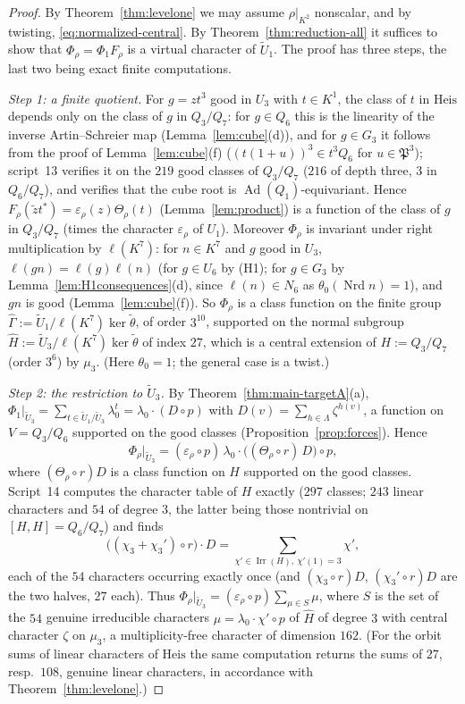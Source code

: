 \documentclass[11pt]{article}
\newcommand{\Nrd}{\operatorname{Nrd}}
\newcommand{\Irr}{\operatorname{Irr}}
\newcommand{\Ad}{\operatorname{Ad}}
\newcommand{\tU}{\widetilde U}
\newcommand{\tth}{\widetilde\theta}
\newcommand{\Pfr}{\mathfrak P}
\theoremstyle{plain}
\theoremstyle{definition}
\begin{document}
\begin{proof}
By Theorem~\ref{thm:levelone} we may assume $\rho|_{K^2}$ nonscalar, and
by twisting, \eqref{eq:normalized-central}.  By
Theorem~\ref{thm:reduction-all} it suffices to show that
$\Phi_\rho=\Phi_1F_\rho$ is a virtual character of $\tU_1$.  The proof
has three steps, the last two being exact finite computations.

\emph{Step 1: a finite quotient.}  For $g=zt^3$ good in $U_3$ with
$t\in K^1$, the class of $t$ in $\mathrm{Heis}$ depends only on the
class of $g$ in $Q_3/Q_7$: for $g\in Q_6$ this is the linearity of the
inverse Artin--Schreier map (Lemma~\ref{lem:cube}(d)), and for
$g\in G_3$ it follows from the proof of Lemma~\ref{lem:cube}(f)
($(t(1+u))^3\in t^3Q_6$ for $u\in\Pfr^3$); script~13 verifies it on
the $219$ good classes of $Q_3/Q_7$ ($216$ of depth three, $3$ in
$Q_6/Q_7$), and verifies that the cube root is $\Ad(Q_1)$-equivariant.
Hence $F_\rho(\tilde zt^*)=\varepsilon_\rho(z)\Theta_\rho(t)$
(Lemma~\ref{lem:product}) is a function of the class of $g$ in
$Q_3/Q_7$ (times the character $\varepsilon_\rho$ of $U_1$).  Moreover
$\Phi_\rho$ is invariant under right multiplication by $\ell(K^7)$: for
$n\in K^7$ and $g$ good in $U_3$, $\ell(gn)=\ell(g)\ell(n)$ (for
$g\in U_6$ by (H1); for $g\in G_3$ by Lemma~\ref{lem:H1consequences}(d),
since $\ell(n)\in N_6$ as $\theta_0(\Nrd n)=1$), and $gn$ is good
(Lemma~\ref{lem:cube}(f)).  So $\Phi_\rho$ is a class function on the
finite group $\hat\Gamma:=\tU_1/\ell(K^7)\ker\tth$, of order $3^{10}$,
supported on the normal subgroup $\hat H:=\tU_3/\ell(K^7)\ker\tth$ of
index $27$, which is a central extension of $H:=Q_3/Q_7$ (order $3^6$)
by $\mu_3$.  (Here $\theta_0=1$; the general case is a twist.)

\emph{Step 2: the restriction to $\tU_3$.}  By
Theorem~\ref{thm:main-targetA}(a), $\Phi_1|_{\tU_3}=\sum_{t\in\tU_1/\tU_3}\lambda_0^t=\lambda_0\cdot(D\circ p)$
with $D(v)=\sum_{h\in\Lambda}\zeta^{h(v)}$, a function on $V=Q_3/Q_6$
supported on the good classes (Proposition~\ref{prop:forces}).  Hence
\[
 \Phi_\rho|_{\tU_3}=(\varepsilon_\rho\circ p)\,\lambda_0\cdot\bigl((\Theta_\rho\circ r)\,D\bigr)\circ p ,
\]
where $(\Theta_\rho\circ r)D$ is a class function on $H$ supported on
the good classes.  Script~14 computes the character table of $H$
exactly ($297$ classes; $243$ linear characters and $54$ of degree
$3$, the latter being those nontrivial on $[H,H]=Q_6/Q_7$) and finds
\[
 \bigl((\chi_3+\chi_3')\circ r\bigr)\cdot D=\sum_{\chi'\in\Irr(H),\ \chi'(1)=3}\chi' ,
\]
each of the $54$ characters occurring exactly once (and
$(\chi_3\circ r)D$, $(\chi_3'\circ r)D$ are the two halves, $27$ each).
Thus $\Phi_\rho|_{\tU_3}=(\varepsilon_\rho\circ p)\sum_{\mu\in S}\mu$,
where $S$ is the set of the $54$ genuine irreducible characters
$\mu=\lambda_0\cdot\chi'\circ p$ of $\hat H$ of degree $3$ with central
character $\zeta$ on $\mu_3$, a multiplicity-free character of
dimension $162$.  (For the orbit sums of linear characters of
$\mathrm{Heis}$ the same computation returns the sums of $27$, resp.\
$108$, genuine linear characters, in accordance with
Theorem~\ref{thm:levelone}.)


\end{proof}
\end{document}
